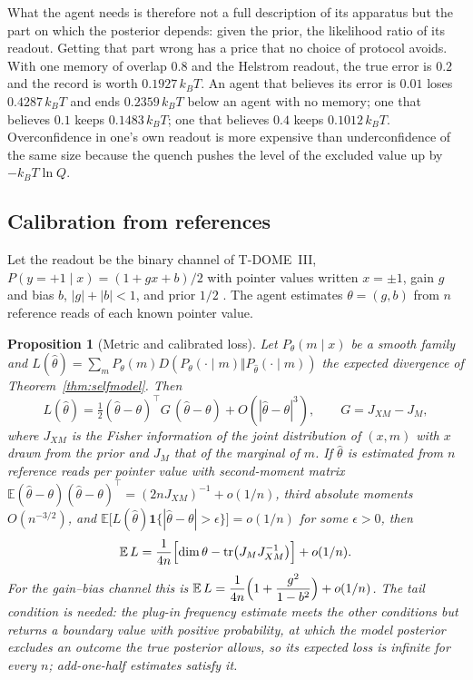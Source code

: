 \documentclass[12pt]{article}
\newtheorem{proposition}[theorem]{Proposition}
\begin{document}
What the agent needs is therefore not a full description of its apparatus but the part on which the posterior depends: given the prior, the likelihood ratio of its readout. Getting that part wrong has a price that no choice of protocol avoids. With one memory of overlap $0.8$ and the Helstrom readout, the true error is $0.2$ and the record is worth $0.1927\,k_BT$. An agent that believes its error is $0.01$ loses $0.4287\,k_BT$ and ends $0.2359\,k_BT$ below an agent with no memory; one that believes $0.1$ keeps $0.1483\,k_BT$; one that believes $0.4$ keeps $0.1012\,k_BT$. Overconfidence in one's own readout is more expensive than underconfidence of the same size because the quench pushes the level of the excluded value up by $-k_BT\ln Q$.

\subsection{Calibration from references}

Let the readout be the binary channel of T-DOME~III, $P(y=+1\mid x)=(1+gx+b)/2$ with pointer values written $x=\pm1$, gain $g$ and bias $b$, $|g|+|b|<1$, and prior $1/2$ \cite{Liu2026TDOME_III}. The agent estimates $\theta=(g,b)$ from $n$ reference reads of each known pointer value.

\begin{proposition}[Metric and calibrated loss]
\label{prop:calibration}
Let $P_\theta(m\mid x)$ be a smooth family and $L(\hat\theta)=\sum_mP_\theta(m)D(P_\theta(\cdot\mid m)\Vert P_{\hat\theta}(\cdot\mid m))$ the expected divergence of Theorem~\ref{thm:selfmodel}. Then
\[
L(\hat\theta)=\tfrac12(\hat\theta-\theta)^{\!\top}G\,(\hat\theta-\theta)+O(|\hat\theta-\theta|^3),\qquad G=J_{XM}-J_M,
\]
where $J_{XM}$ is the Fisher information of the joint distribution of $(x,m)$ with $x$ drawn from the prior and $J_M$ that of the marginal of $m$. If $\hat\theta$ is estimated from $n$ reference reads per pointer value with second-moment matrix $\mathbb E(\hat\theta-\theta)(\hat\theta-\theta)^{\!\top}=(2nJ_{XM})^{-1}+o(1/n)$, third absolute moments $O(n^{-3/2})$, and $\mathbb E\bigl[L(\hat\theta)\mathbf 1\{|\hat\theta-\theta|>\epsilon\}\bigr]=o(1/n)$ for some $\epsilon>0$, then
\[
\mathbb E\,L=\frac1{4n}\Bigl[\dim\theta-\tr\bigl(J_MJ_{XM}^{-1}\bigr)\Bigr]+o(1/n).
\]
For the gain--bias channel this is $\mathbb E\,L=\dfrac{1}{4n}\Bigl(1+\dfrac{g^2}{1-b^2}\Bigr)+o(1/n)$. The tail condition is needed: the plug-in frequency estimate meets the other conditions but returns a boundary value with positive probability, at which the model posterior excludes an outcome the true posterior allows, so its expected loss is infinite for every $n$; add-one-half estimates satisfy it.
\end{proposition}
\end{document}
